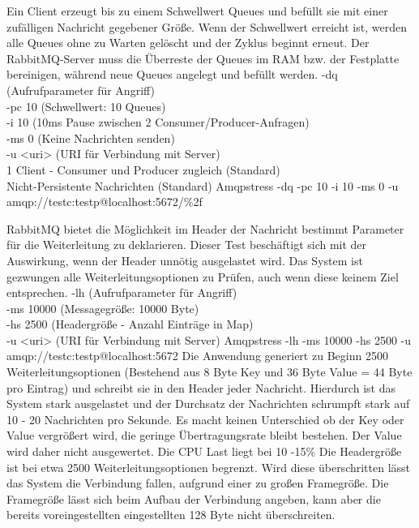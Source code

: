 \documentclass[	a4paper,
			11pt,
			titlepage,
			oneside,
			fleqn,
			listof=totoc,
			parskip,
			chapterprefix=false,
			numbers=noenddot]{scrreprt}
\begin{document}
\clearpage
		{Ein Client erzeugt bis zu einem Schwellwert Queues und befüllt sie mit einer zufälligen Nachricht gegebener Größe. Wenn der Schwellwert erreicht ist, werden alle Queues ohne zu Warten gelöscht und der Zyklus beginnt erneut. Der RabbitMQ-Server muss die Überreste der Queues im RAM bzw. der Festplatte bereinigen, während neue Queues angelegt und befüllt werden.}%
		{%
		 -dq (Aufrufparameter für Angriff) \\
		 -pc 10 (Schwellwert: 10 Queues) \\
		 -i 10 (10ms Pause zwischen 2 Consumer/Producer-Anfragen) \\
		 -ms 0 (Keine Nachrichten senden) \\
		 -u <uri> (URI für Verbindung mit Server) \\
		 1 Client - Consumer und Producer zugleich (Standard) \\
		 Nicht-Persistente Nachrichten (Standard)
		}%
		{Amqpstress -dq -pc 10 -i 10 -ms 0  -u amqp://testc:testp@localhost:5672/\%2f}%
		{}

\clearpage
		{RabbitMQ bietet die Möglichkeit im Header der Nachricht bestimmt Parameter für die Weiterleitung zu deklarieren. Dieser Test beschäftigt sich mit der Auswirkung, wenn der Header unnötig ausgelastet wird. Das System ist gezwungen alle Weiterleitungsoptionen zu Prüfen, auch wenn diese keinem Ziel entsprechen.}%
		{%
		 -lh (Aufrufparameter für Angriff) \\
		 -ms 10000 (Messagegröße: 10000 Byte) \\
		 -hs 2500 (Headergröße - Anzahl Einträge in Map) \\
		 -u <uri> (URI für Verbindung mit Server)
		}%
		{Amqpstress -lh -ms 10000 -hs 2500 -u amqp://testc:testp@localhost:5672}%
		{Die Anwendung generiert zu Beginn 2500 Weiterleitungsoptionen (Bestehend aus 8 Byte Key und 36 Byte Value = 44 Byte pro Eintrag) und schreibt sie in den Header jeder Nachricht. Hierdurch ist das System stark ausgelastet und der Durchsatz der Nachrichten schrumpft stark auf 10 - 20 Nachrichten pro Sekunde. Es macht keinen Unterschied ob der Key oder Value vergrößert wird, die geringe Übertragungsrate bleibt bestehen. Der Value wird daher nicht ausgewertet. Die CPU Last liegt bei 10 -15\%}
		{Die Headergröße ist bei etwa 2500 Weiterleitungsoptionen begrenzt. Wird diese überschritten lässt das System die Verbindung fallen, aufgrund einer zu großen Framegröße. Die Framegröße lässt sich beim Aufbau der Verbindung angeben, kann aber die bereits voreingestellten eingestellten 128 Byte nicht überschreiten.}
\end{document}
